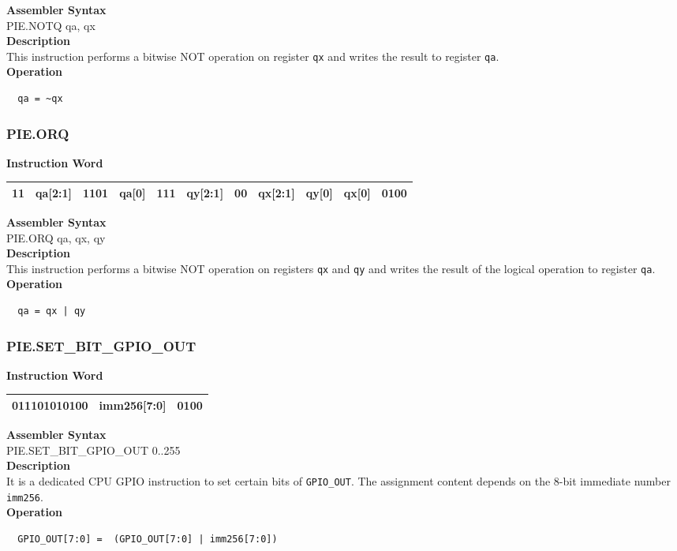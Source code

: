 \textbf{Assembler Syntax} \\
PIE.NOTQ qa, qx \\
\textbf{Description} \\
This instruction performs a bitwise NOT operation on register \lstinline{qx} and writes the result to register \lstinline{qa}.\\
\textbf{Operation}
\begin{lstlisting}
  qa = ~qx
\end{lstlisting}

\newpage
\subsubsection{PIE.ORQ}\label{instruction:PIEORQ}
\setlength\tabcolsep{6pt}
\textbf{Instruction Word} \\
\begin{tabular}{|c|c|c|c|c|c|c|c|c|c|c|}
	\hline
	11 & qa[2:1] & 1101 & qa[0] & 111 & qy[2:1] & 00 & qx[2:1] & qy[0] & qx[0] & 0100 \\
	\hline
\end{tabular}

\textbf{Assembler Syntax} \\
PIE.ORQ qa, qx, qy \\
\textbf{Description} \\
This instruction performs a bitwise NOT operation on registers \lstinline{qx} and \lstinline{qy} and writes the result of the logical operation to register \lstinline{qa}.\\
\textbf{Operation}
\begin{lstlisting}
  qa = qx | qy
\end{lstlisting}

\newpage
\subsubsection{PIE.SET\_BIT\_GPIO\_OUT}\label{instruction:PIESETBITGPIOOUT}
\setlength\tabcolsep{6pt}
\textbf{Instruction Word} \\
\begin{tabular}{|c|c|c|}
	\hline
	011101010100 & imm256[7:0] & 0100 \\
	\hline
\end{tabular}

\textbf{Assembler Syntax} \\
PIE.SET\_BIT\_GPIO\_OUT 0..255 \\
\textbf{Description} \\
It is a dedicated CPU GPIO instruction to set certain bits of \lstinline{GPIO_OUT}. The assignment content depends on the 8-bit immediate number \lstinline{imm256}.\\
\textbf{Operation}
\begin{lstlisting}
  GPIO_OUT[7:0] =  (GPIO_OUT[7:0] | imm256[7:0])
\end{lstlisting}

